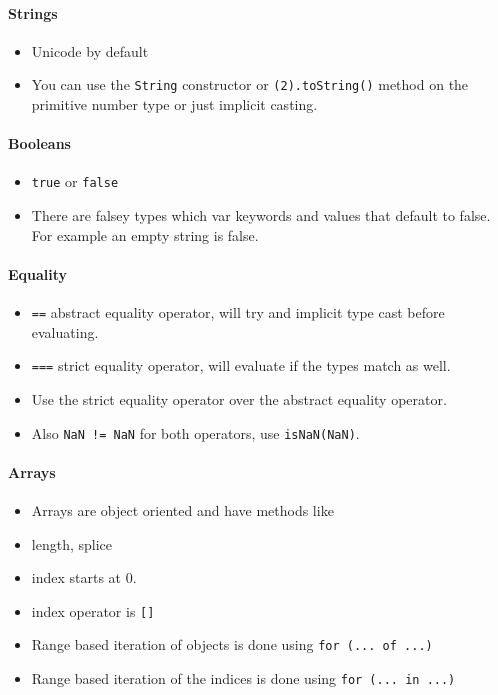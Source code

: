 \documentclass[../CMPUT-404-Notes.tex]{subfiles}
\begin{document}
\paragraph{Strings}
\begin{itemize}
  \item Unicode by default
  \item You can use the \texttt{String} constructor or \texttt{(2).toString()} method on the primitive number type or just implicit casting.
\end{itemize}
\paragraph{Booleans}
\begin{itemize}
  \item \texttt{true} or \texttt{false}
  \item There are falsey types which var keywords and values that default to false. For example an empty string is false.
\end{itemize}
\paragraph{Equality}
\begin{itemize}
  \item \texttt{==} abstract equality operator, will try and implicit type cast before evaluating.
  \item \texttt{===} strict equality operator, will evaluate if the types match as well.
  \item Use the strict equality operator over the abstract equality operator.  
  \item Also \texttt{NaN != NaN} for both operators, use \texttt{isNaN(NaN)}.
\end{itemize}
\paragraph{Arrays}
\begin{itemize}
  \item Arrays are object oriented and have methods like
  \item length, splice
  \item index starts at 0.
  \item index operator is \texttt{[]}
  \item Range based iteration of objects is done using \texttt{for (... of ...)}
  \item Range based iteration of the indices is done using \texttt{for (... in ...)}
\end{itemize}
\end{document}
